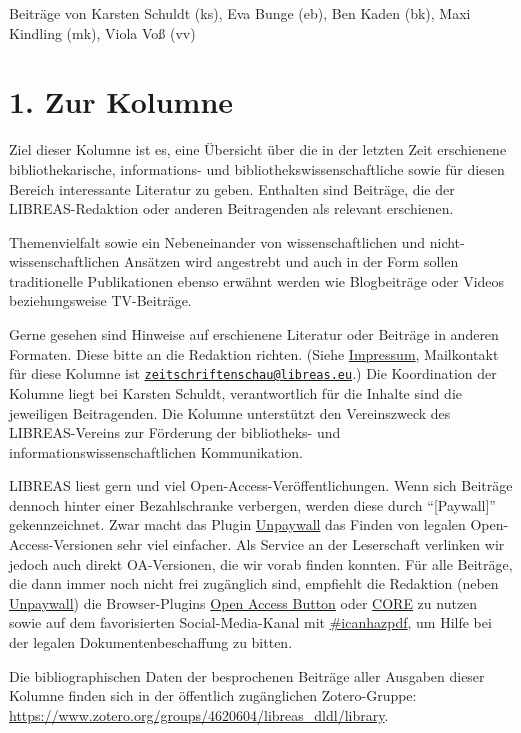 \documentclass[a4paper,
fontsize=11pt,
oneside,
numbers=noperiodatend,
parskip=half-,
bibliography=totoc,
final
]{scrartcl}
\date{}
\begin{document}
Beiträge von Karsten Schuldt (ks), Eva Bunge (eb), Ben Kaden (bk), Maxi
Kindling (mk), Viola Voß (vv)

\section{1. Zur Kolumne}\label{zur-kolumne}

Ziel dieser Kolumne ist es, eine Übersicht über die in der letzten Zeit
erschienene bibliothekarische, informations- und
bibliothekswissenschaftliche sowie für diesen Bereich interessante
Literatur zu geben. Enthalten sind Beiträge, die der LIBREAS-Redaktion
oder anderen Beitragenden als relevant erschienen.

Themenvielfalt sowie ein Nebeneinander von wissenschaftlichen und
nicht-wissenschaftlichen Ansätzen wird angestrebt und auch in der Form
sollen traditionelle Publikationen ebenso erwähnt werden wie
Blogbeiträge oder Videos beziehungsweise TV-Beiträge.

Gerne gesehen sind Hinweise auf erschienene Literatur oder Beiträge in
anderen Formaten. Diese bitte an die Redaktion richten. (Siehe
\href{http://libreas.eu/about/}{Impressum}, Mailkontakt für diese
Kolumne ist
\href{mailto:zeitschriftenschau@libreas.eu}{\nolinkurl{zeitschriftenschau@libreas.eu}}.)
Die Koordination der Kolumne liegt bei Karsten Schuldt, verantwortlich
für die Inhalte sind die jeweiligen Beitragenden. Die Kolumne
unterstützt den Vereinszweck des LIBREAS-Vereins zur Förderung der
bibliotheks- und informationswissenschaftlichen Kommunikation.

LIBREAS liest gern und viel Open-Access-Veröffentlichungen. Wenn sich
Beiträge dennoch hinter einer Bezahlschranke verbergen, werden diese
durch ``{[}Paywall{]}'' gekennzeichnet. Zwar macht das Plugin
\href{http://unpaywall.org/}{Unpaywall} das Finden von legalen
Open-Access-Versionen sehr viel einfacher. Als Service an der
Leserschaft verlinken wir jedoch auch direkt OA-Versionen, die wir vorab
finden konnten. Für alle Beiträge, die dann immer noch nicht frei
zugänglich sind, empfiehlt die Redaktion (neben
\href{http://unpaywall.org/}{Unpaywall}) die Browser-Plugins
\href{https://openaccessbutton.org/}{Open Access Button} oder
\href{https://core.ac.uk/services/discovery/}{CORE} zu nutzen sowie auf
dem favorisierten Social-Media-Kanal mit
\href{https://mastodon.social/tags/icanhazpdf}{\#icanhazpdf}, um Hilfe
bei der legalen Dokumentenbeschaffung zu bitten.

Die bibliographischen Daten der besprochenen Beiträge aller Ausgaben
dieser Kolumne finden sich in der öffentlich zugänglichen Zotero-Gruppe:
\url{https://www.zotero.org/groups/4620604/libreas_dldl/library}.
\end{document}
